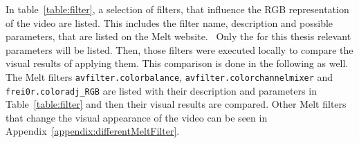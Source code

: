 \documentclass[../MasterThesis.tex]{subfiles}
\begin{document}
In table~\ref{table:filter}, a selection of filters, that influence the RGB representation of the video are listed. This includes the filter name, description and possible parameters, that are listed on the Melt website.~\cite{melt_filters} Only the for this thesis relevant parameters will be listed.
Then, those filters were executed locally to compare the visual results of applying them. This comparison is done in the following as well.
The Melt filters \texttt{avfilter.colorbalance}, \texttt{avfilter\-.colorchannelmixer} and \texttt{frei0r\-.coloradj\_RGB} are listed with their description and parameters in Table~\ref{table:filter} and then their visual results are compared. Other Melt filters that change the visual appearance of the video can be seen in Appendix~\ref{appendix:differentMeltFilter}.
\end{document}

